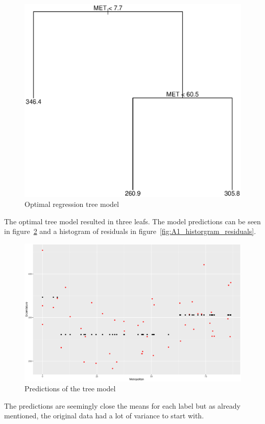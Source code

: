\documentclass[a4paper,12pt]{article}
\begin{document}
    \begin{figure}[H]
    \centering
    \includegraphics[width=\textwidth]{figures/A1_tree}  
    \caption{Optimal regression tree model \label{fig:A1_tree}}
    \end{figure}
    The optimal tree model resulted in three leafs. The model predictions can be seen in figure~\ref{fig:A1_fit} and a histogram of residuals in figure~\ref{fig:A1_historgram_residuals}.

    \begin{figure}[H]
    \centering
    \includegraphics[width=\textwidth]{figures/A1_fit}  
    \caption{Predictions of the tree model \label{fig:A1_fit}}
    \end{figure}
    The predictions are seemingly close the means for each label but as already mentioned, the original data had a lot of variance to start with.
\end{document}
